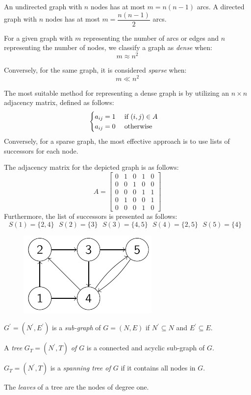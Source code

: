 An undirected graph with $n$ nodes has at most $m=n(n-1)$ arcs. 
A directed graph with $n$ nodes has at most $m=\dfrac{n(n-1)}{2}$ arcs.
\newpage
\begin{definition}
    For a given graph with $m$ representing the number of arcs or edges and $n$ representing the number of nodes, we classify a graph as \emph{dense} when:
    \[m \approx n^2\]

    Conversely, for the same graph, it is considered \emph{sparse} when:
    \[m \ll n^2\]
\end{definition}
The most suitable method for representing a dense graph is by utilizing an $n \times n$ adjacency matrix, defined as follows:
\[
\begin{cases}
    a_{ij}=1 \:\:\:\:\:\: \textnormal{if }(i,j) \in A \\
    a_{ij}=0 \:\:\:\:\:\: \textnormal{otherwise}    
\end{cases}    
\]
Conversely, for a sparse graph, the most effective approach is to use lists of successors for each node.
\begin{example}
    The adjacency matrix for the depicted graph is as follows:
    \[A=\begin{bmatrix}
        0 & 1 & 0 & 1 & 0 \\
        0 & 0 & 1 & 0 & 0 \\
        0 & 0 & 0 & 1 & 1 \\
        0 & 1 & 0 & 0 & 1 \\
        0 & 0 & 0 & 1 & 0 
        \end{bmatrix}\]
    Furthermore, the list of successors is presented as follows:
    \[S(1)=\{2,4\} \:\:\: S(2)=\{3\} \:\:\:S(3)=\{4,5\} \:\:\: S(4)=\{2,5\} \:\:\: S(5)=\{4\} \:\:\:\]
    \begin{figure}[H]
        \centering
        \includegraphics[width=0.3\linewidth]{images/graphs.png}
    \end{figure}
\end{example}
\begin{definition}
    $G^{'}=(N^{'},E^{'})$ is a \emph{sub-graph} of $G=(N,E)$ if $N^{'} \subseteq N$ and $E^{'} \subseteq E$. 

    A \emph{tree} $G_T=(N^{'},T)$ \emph{of $G$} is a connected and acyclic sub-graph of $G$. 

    $G_T=(N^{'},T)$ is a \emph{spanning tree of $G$} if it contains all nodes in $G$. 

    The \emph{leaves} of a tree are the nodes of degree one. 
\end{definition}
